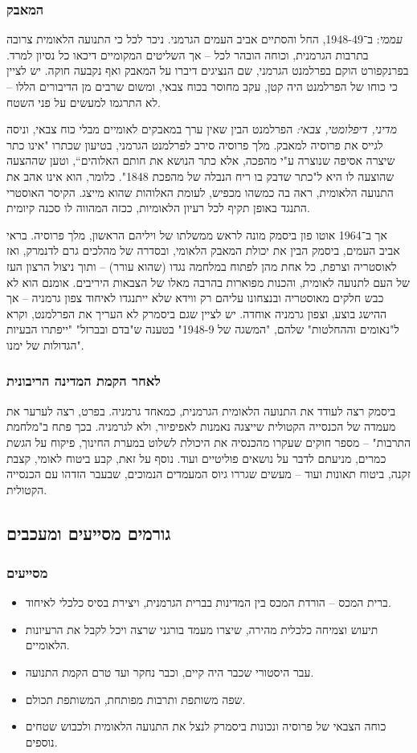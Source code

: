 \documentclass[a4paper]{book}
\begin{document}
	\subsubsection{המאבק}
	\textit{עממי}: ב־1948-49, החל והסתיים אביב העמים הגרמני. ניכר לכל כי התנועה הלאומית צרובה בתרבות הגרמנית, וכוחה הובהר לכל – אך השליטים המקומיים דיכאו כל נסיון למרד. בפרנקפורט הוקם בפרלמנט הגרמני, שם הנציגים דיברו על המאבק ואף נקבעה חוקה. יש לציין כי כוחו של הפרלמנט היה קטן, עקב מחוסר בכוח צבאי, ומשום שרבים מן הדיבורים הללו – לא התרגמו למעשים על פני השטח. 
	
	\textit{מדיני, דיפלומטי, צבאי: }הפרלמנט הבין שאין ערך במאבקים לאומיים מבלי כוח צבאי, וניסה לגייס את פרוסיה למאבק. מלך פרוסיה סירב לפרלמנט הגרמני, בטיעון שכתרו "אינו כתר שיצרה אסיפה שנוצרה ע"י מהפכה, אלא כתר הנושא את חותם האלוהים``, וטען שההצעה שהוצעה לו היא ל"כתר שדבק בו ריח הנבלה של מהפכת 1848". כלומר, הוא אינו אהב את התנועה הלאומית, ראה בה כמשהו מכפיש, לעומת האלוהות שהוא מייצג. הקיסר האוסטרי התנגד באופן תקיף לכל רעיון הלאומיות, ככזה המהווה לו סכנה קיומית. 
	
	אך ב־1964 אוטו פון ביסמק מונה לראש ממשלתו של ויליהם הראשון, מלך פרוסיה. בראי אביב העמים, ביסמק הבין את יכולת המאבק הלאומי, ובסדרה של מהלכים גרם לדנמרק, ואז לאוסטריה וצרפת, כל אחת מהן לפתוח במלחמה נגדו (שהוא עורר) – ותוך ניצול הרצון העז של העם לתנועה לאומית, והכנות מפוארות בהרבה מאלו של הצבאות היריבים. אומנם הוא לא כבש חלקים מאוסטריה ובנצחונו עליהם רק ווידא שלא ייתנגדו לאיחוד צפון גרמניה – אך ההישג בוצע, וצפון גרמניה אוחדה. יש לציין שגם ביסמרק לא העריך את הפרלמנט, וקרא ל"נאומים וההחלטות" שלהם, "המשגה של 1948-9" בטענה ש"בדם ובברזל" "ייפתרו הבעיות הגדולות של ימנו". 
	\subsubsection{לאחר הקמת המדינה הריבונית}
	ביסמק רצה לעודד את התנועה הלאומית הגרמנית, כמאחד גרמניה. בפרט, רצה לערער את מעמדה של הכנסייה הקטולית שייצגה נאמנות לאפיפיור, ולא לגרמניה. בכך פתח ב"מלחמת התרבות" – מספר חוקים שעקרו מהכנסיה את היכולת לשלוט במערת החינוך, פיקוח על הגשת כמרים, מניעתם לדבר על נושאים פוליטיים ועוד. נוסף על זאת, קבע ביטוח לאומי, קצבת זקנה, ביטוח תאונות ועוד – מעשים שגררו גיוס המעמדים הנמוכים, שבעבר הזדהו עם הכנסייה הקטולית. 
	
	\subsection{גורמים מסייעים ומעכבים}
	\subsubsection{מסייעים}
	\begin{itemize}
		\item ברית המכס – הורדת המכס בין המדינות בברית הגרמנית, ויצירת בסיס כלכלי לאיחוד. 
		\item תיעוש וצמיחה כלכלית מהירה, שיצרו מעמד בורגני שרצה ויכל לקבל את הרעיונות הלאומיים. 
		\item עבר היסטורי שכבר היה קיים, וכבר נחקר ועד טרם הקמת התנועה. 
		\item שפה משותפת ותרבות מפותחת, המשותפת תכולם. 
		\item כוחה הצבאי של פרוסיה ונכונות ביסמרק לנצל את התנועה הלאומית ולכבוש שטחים נוספים. 
	\end{itemize}
\end{document}
